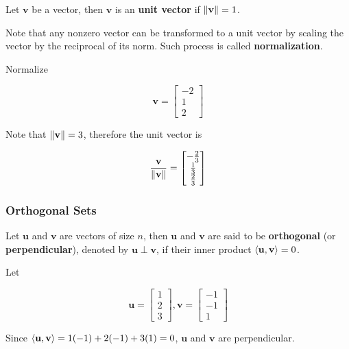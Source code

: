 \documentclass[a4paper,12pt]{article}
\begin{document}
\begin{dft}
  Let $\mathbf{v}$ be a vector, then $\mathbf{v}$ is an \textbf{unit vector} if $\left\| \mathbf{v}\right\|=1$.
\end{dft}\n

Note that any nonzero vector can be transformed to a unit vector by scaling the vector by the reciprocal of its norm. Such process is called \textbf{normalization}.\n

\begin{exm}
  Normalize

  $$\mathbf{v}=\begin{bmatrix}
    -2\\
    1\\
    2
  \end{bmatrix}$$\s

  \ans Note that $\left\| \mathbf{v}\right\|=3$, therefore the unit vector is

  $$\frac{\mathbf{v}}{\left\| \mathbf{v}\right\|}=\begin{bmatrix}
    -\frac{2}{3}\\
    \frac{1}{3}\\
    \frac{2}{3}
  \end{bmatrix}$$
\end{exm}

\subsubsection{Orthogonal Sets}
\begin{dft}
  Let $\mathbf{u}$ and $\mathbf{v}$ are vectors of size $n$, then $\mathbf{u}$ and $\mathbf{v}$ are said to be \textbf{orthogonal} (or \textbf{perpendicular}), denoted by $\mathbf{u}\perp\mathbf{v}$, if their inner product $\left\langle \mathbf{u},\mathbf{v}\right\rangle=0$.
\end{dft}\n

\begin{exm}
  Let

  $$\mathbf{u}=\begin{bmatrix}
    1\\
    2\\
    3
  \end{bmatrix},\mathbf{v}=\begin{bmatrix}
    -1\\
    -1\\
    1
  \end{bmatrix}$$\s

  Since $\left\langle \mathbf{u},\mathbf{v}\right\rangle=1(-1)+2(-1)+3(1)=0$, $\mathbf{u}$ and $\mathbf{v}$ are perpendicular.
\end{exm}\n
\end{document}
